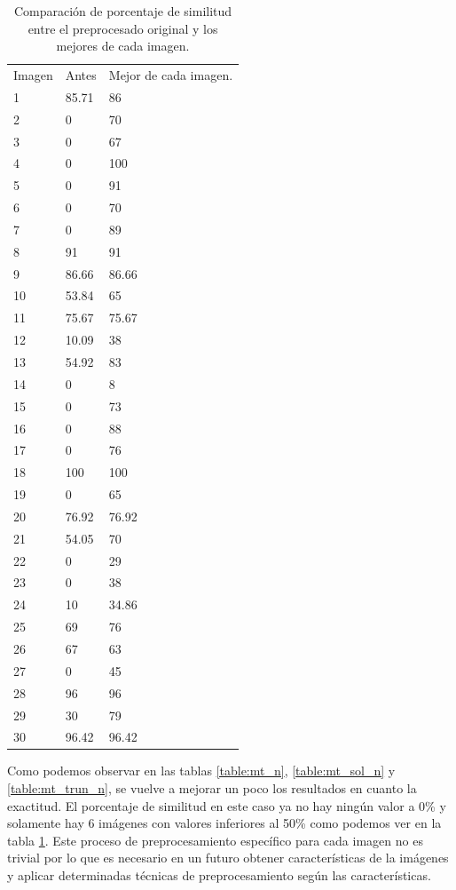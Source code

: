 \begin{table}[H]
	\centering
	\begin{tabular}{lll} 
		Imagen & Antes  & Mejor de cada imagen. \\
		1  & 85.71 & 86      \\     
		2  & 0     & 70      \\  
		3  & 0     & 67      \\  
		4  & 0     & 100    \\  
		5  & 0     & 91  \\  
		6  & 0     & 70  \\ 
		7  & 0     & 89  \\  
		8  & 91    & 91  \\  
		9  & 86.66 & 86.66  \\  
		10 & 53.84 & 65  \\  
		11 & 75.67 & 75.67 \\  
		12 & 10.09 & 38  \\  
		13 & 54.92 & 83  \\  
		14 & 0     & 8      \\  
		15 & 0     & 73      \\  
		16 & 0     & 88      \\  
		17 & 0     & 76      \\  
		18 & 100   & 100    \\    
		19 & 0     & 65     \\     
		20 & 76.92 & 76.92  \\  
		21 & 54.05 & 70  \\  
		22 & 0     & 29  \\  
		23 & 0     & 38  \\  
		24 & 10    & 34.86  \\  
		25 & 69    & 76  \\  
		26 & 67    & 63  \\  
		27 & 0     & 45      \\  
		28 & 96    & 96     \\  
		29 & 30    & 79  \\  
		30 & 96.42 & 96.42  \\  
	\end{tabular}
	\caption{Comparación de porcentaje de similitud entre el preprocesado original y los mejores de cada imagen.}
	\label{table:simi_n}
\end{table}
Como podemos observar en las tablas \ref{table:mt_n}, \ref{table:mt_sol_n} y \ref{table:mt_trun_n}, se vuelve a mejorar un poco los resultados en cuanto la exactitud. El porcentaje de similitud en este caso ya no hay ningún valor a 0\% y solamente hay 6 imágenes con valores inferiores al 50\% como podemos ver en la tabla \ref{table:simi_n}. Este proceso de preprocesamiento específico para cada imagen no es trivial por lo que es necesario en un futuro obtener características de la imágenes y aplicar determinadas técnicas de preprocesamiento según las características.

